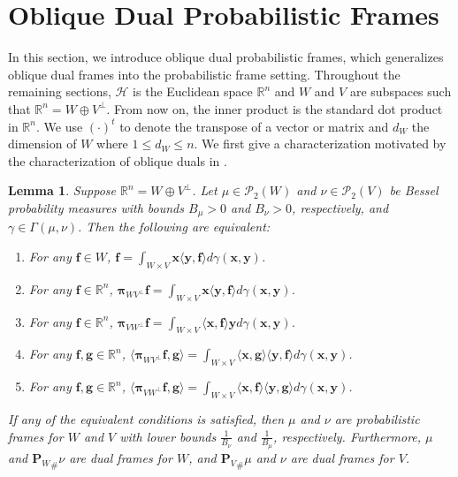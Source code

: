 \documentclass{amsart}
\numberwithin{equation}{section}
\newcommand{\bP}{{\mathbf P}}
\newcommand{\bpi}{{\boldsymbol{\pi}}}
\theoremstyle{plain}
\newtheorem{lemma}[theorem]{Lemma}
\theoremstyle{remark}
\theoremstyle{definition}
\begin{document}
\section{Oblique Dual Probabilistic Frames}\label{section:probabilisticdual}
In this section, we introduce oblique dual probabilistic frames, which generalizes oblique dual frames into the probabilistic frame setting. Throughout the remaining sections, $\mathcal{H}$ is the Euclidean space $\mathbb{R}^n$ and $W$ and $V$ are subspaces such that $\mathbb{R}^n = W \oplus V^\perp$. From now on, the inner product is the standard dot product in $\mathbb{R}^n$. We use $(\cdot)^t$ to denote the transpose of a vector or matrix and $d_W$ the dimension of $W$ where $1 \leq d_W \leq n$.
We first give a characterization motivated by the characterization of oblique duals in \cite[Lemma 3.1]{christensen2004oblique}.
\begin{lemma}\label{lemma:obliqueDualEquiv}
    Suppose $\mathbb{R}^n = W \oplus V^\perp$. Let $\mu \in \mathcal{P}_2(W) $ and $\nu \in \mathcal{P}_2(V)$ be Bessel probability measures with bounds $B_\mu>0$ and $B_\nu>0$, respectively, and $\gamma \in \Gamma(\mu, \nu)$. Then the following are equivalent:
\begin{enumerate}
    \item For any $\mathbf{f} \in W$, $\mathbf{f} = \int_{W \times V} \mathbf{x} \langle \mathbf{y}, \mathbf{f} \rangle d\gamma(\mathbf{x}, \mathbf{y})$. 

    \item For any $\mathbf{f} \in \mathbb{R}^n$, 
   $\bpi_{WV^\perp}\mathbf{f} = \int_{W \times V} \mathbf{x} \langle \mathbf{y}, \mathbf{f} \rangle d\gamma(\mathbf{x}, \mathbf{y})$. 
    
        \item For any $\mathbf{f} \in \mathbb{R}^n$, $\bpi_{VW^\perp}\mathbf{f} = \int_{W \times V} \langle \mathbf{x}, \mathbf{f} \rangle \mathbf{y} d\gamma(\mathbf{x}, \mathbf{y})$. 

    \item For any $\mathbf{f}, \mathbf{g} \in \mathbb{R}^n$, $\langle \bpi_{WV^\perp}\mathbf{f}, \mathbf{g} \rangle = \int_{W \times V} \langle \mathbf{x}, \mathbf{g} \rangle \langle \mathbf{y}, \mathbf{f} \rangle d\gamma(\mathbf{x}, \mathbf{y})$. 

    \item For any $\mathbf{f}, \mathbf{g} \in \mathbb{R}^n$, $\langle \bpi_{VW^\perp}\mathbf{f}, \mathbf{g} \rangle = \int_{W \times V} \langle \mathbf{x}, \mathbf{f} \rangle \langle \mathbf{y}, \mathbf{g} \rangle d\gamma(\mathbf{x}, \mathbf{y})$. 
\end{enumerate}
If any of the equivalent conditions is satisfied, then $\mu$ and $\nu$ are probabilistic frames for $W$ and $V$ with lower bounds $\frac{1}{B_\nu}$ and  $\frac{1}{B_\mu}$, respectively. Furthermore, $\mu$ and ${\bP_W}_\#\nu$ are dual frames for $W$, and ${\bP_V}_\#\mu$ and $\nu$ are dual frames for $V$.
\end{lemma}
\end{document}

